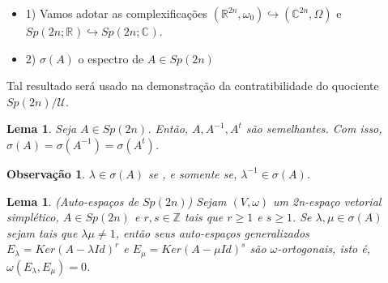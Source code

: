 \documentclass{beamer}
\newtheorem{lema}[teorema]{Lema}
\newtheorem{observacao}[teorema]{Observação}
\newcommand{\complexo}[1]{\mathbb{C}^{#1}}
\newcommand{\espectrooperador}[1]{\sigma(#1)}
\newcommand{\formaSimpleticaabrev}{\omega_{0}}
\newcommand{\gruposimpletico}[1]{Sp(#1)}
\newcommand{\gruposimpleticocomplexo}[1]{Sp(#1; \complexo{})}
\newcommand{\gruposimpleticoreal}[1]{Sp(#1;\reta)}
\newcommand{\inteiros}{\mathbb{Z}}
\newcommand{\matrizSimpleticaOrtogonal}{\mathcal{U}}
\newcommand{\real}[1]{\mathbb{R}^{#1}}
\newcommand{\reta}{\real{}}
\begin{document}
\begin{frame}
	\begin{itemize}
		\item 1) Vamos adotar as complexificações $(\real{2n}, \formaSimpleticaabrev) \hookrightarrow (\complexo{2n}, \Omega)$ e $\gruposimpleticoreal{2n} \hookrightarrow \gruposimpleticocomplexo{2n}$. 
		
		\item 2) $\espectrooperador{A}$ o espectro de $A \in \gruposimpletico{2n}$ 
	\end{itemize}	
	
	\begin{tiny}
		Tal resultado será usado na demonstração da contratibilidade do quociente $\gruposimpletico{2n}/\matrizSimpleticaOrtogonal$.
		
	\end{tiny}
		\begin{lema}
			Seja $A \in \gruposimpletico{2n}$. Então, $A, A^{-1}, A^{t}$ são semelhantes. Com isso, $\sigma(A) = \sigma(A^{-1}) = \sigma(A^{t}) $.
		\end{lema}
		\begin{observacao}
			$\lambda \in \sigma(A)$ se , e somente se, $\lambda^{-1}\in \sigma(A)$.
		\end{observacao}
		
\end{frame}

\begin{frame}
	\begin{lema}
		(Auto-espaços de $\gruposimpletico{2n}$) Sejam $(V, \omega)$ um 2n-espaço vetorial simplético, $A \in \gruposimpletico{2n}$ e $r,s \in \inteiros$ tais que $r\geq 1$ e $s\geq 1$. Se $\lambda, \mu \in \sigma(A)$ sejam tais que $\lambda\mu \neq 1$, então seus auto-espaços generalizados $E_{\lambda}=Ker(A-\lambda Id)^{r}$ e  $E_{\mu}=Ker(A-\mu Id)^{s}$ são $\omega$-ortogonais, isto é, $\omega(E_{\lambda}, E_{\mu}) = 0$.
	\end{lema}
\end{frame}
\end{document}
